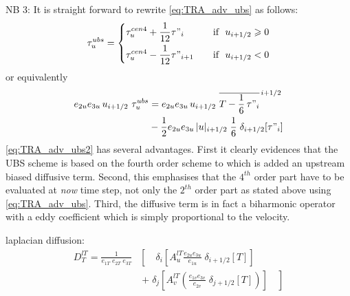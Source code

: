\documentclass[../main/NEMO_manual]{subfiles}
\begin{document}
NB 3: It is straight forward to rewrite \autoref{eq:TRA_adv_ubs} as follows:
\begin{equation}
  \label{eq:ALGOS_tra_adv_ubs2}
  \tau_u^{ubs} = \left\{
	 \begin{aligned}
      & \tau_u^{cen4} + \frac{1}{12} \tau"_i		& \quad \text{if }\ u_{i+1/2} \geqslant 0 \\
      & \tau_u^{cen4} - \frac{1}{12} \tau"_{i+1}	& \quad \text{if }\ u_{i+1/2}       <       0
    \end{aligned}
  \right.
\end{equation}
or equivalently
\begin{equation}
  \label{eq:ALGOS_tra_adv_ubs2}
  \begin{split}
    e_{2u} e_{3u}\,u_{i+1/2} \ \tau_u^{ubs}
    &= e_{2u} e_{3u}\,u_{i+1/2} \ \overline{ T - \frac{1}{6}\,\tau"_i }^{\,i+1/2} \\
    & - \frac{1}{2} e_{2u} e_{3u}\,|u|_{i+1/2} \;\frac{1}{6} \;\delta_{i+1/2}[\tau"_i]
  \end{split}
\end{equation}
\autoref{eq:TRA_adv_ubs2} has several advantages.
First it clearly evidences that the UBS scheme is based on the fourth order scheme to which
is added an upstream biased diffusive term.
Second, this emphasises that the $4^{th}$ order part have to be evaluated at \emph{now} time step,
not only the $2^{th}$ order part as stated above using \autoref{eq:TRA_adv_ubs}.
Third, the diffusive term is in fact a biharmonic operator with a eddy coefficient which
is simply proportional to the velocity.

laplacian diffusion:
\begin{equation}
  \label{eq:ALGOS_tra_ldf_lap}
  \begin{split}
    D_T^{lT} =\frac{1}{e_{1T} \; e_{2T}\;  e_{3T} } &\left[ {\quad \delta_i
        \left[ {A_u^{lT} \frac{e_{2u} e_{3u} }{e_{1u} }\;\delta_{i+1/2}
            \left[ T \right]} \right]} \right. \\
    &\ \left. {+\; \delta_j \left[
          {A_v^{lT} \left( {\frac{e_{1v} e_{3v} }{e_{2v} }\;\delta_{j+1/2} \left[ T
                \right]} \right)} \right]\quad } \right]
  \end{split}
\end{equation}
\end{document}
